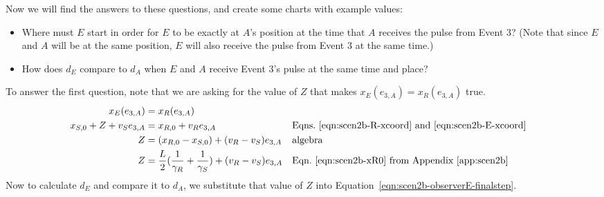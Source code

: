 \documentclass[a4paper]{article}
\theoremstyle{plain}
\theoremstyle{definition}
\begin{document}
Now we will find the answers to these questions, and create some
charts with example values:
\begin{itemize}
\item Where must $E$ start in order for $E$ to be exactly at $A$'s
  position at the time that $A$ receives the pulse from Event 3?
  (Note that since $E$ and $A$ will be at the same position, $E$ will
  also receive the pulse from Event 3 at the same time.)
\item How does $d_E$ compare to $d_A$ when $E$ and $A$ receive Event
  3's pulse at the same time and place?
\end{itemize}

To answer the first question, note that we are asking for the value of
$Z$ that makes $x_E(e_{3,A}) = x_R(e_{3,A})$ true.
\begin{align}
x_E(e_{3,A}) & = x_R(e_{3,A}) \nonumber \\
x_{S,0} + Z + v_S e_{3,A} & = x_{R,0} + v_R e_{3,A} & & \text{Eqns.~\eqref{eqn:scen2b-R-xcoord} and~\eqref{eqn:scen2b-E-xcoord}} \nonumber \\
Z & = (x_{R,0} - x_{S,0}) + (v_R - v_S) e_{3,A} & & \text{algebra} \nonumber \\
Z & = \frac{L}{2} ( \frac{1}{\gamma_R} + \frac{1}{\gamma_S} ) + (v_R - v_S) e_{3,A} & & \text{Eqn.~\eqref{eqn:scen2b-xR0} from Appendix~\ref{app:scen2b}} \label{eqn:scen2b-Z-where-E-A-rcv-pulse-simultaneously}
\end{align}
Now to calculate $d_E$ and compare it to $d_A$, we substitute that value
of $Z$ into Equation~\eqref{eqn:scen2b-observerE-finalstep}.
\end{document}
